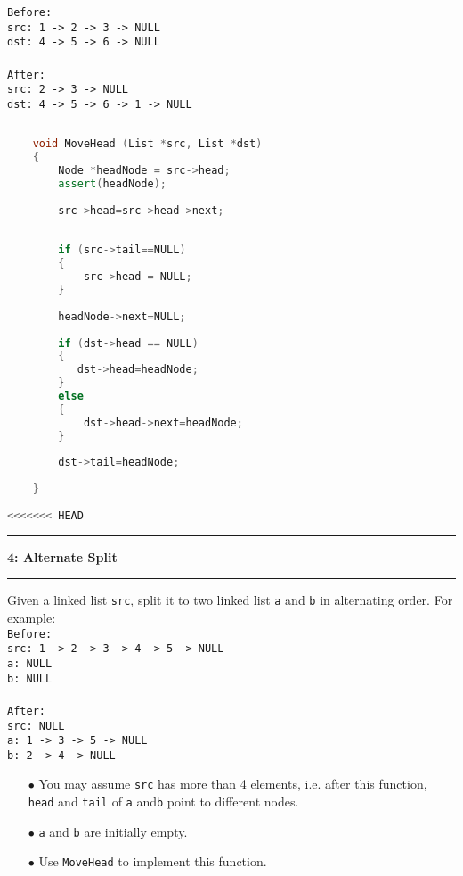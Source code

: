 \documentclass[10.5pt]{article}
\newcommand\question[2]{\vspace{.25in}\hrule\textbf{#1: #2}\vspace{.5em}\hrule\vspace{.10in}}
\begin{document}
    \texttt{Before:}\\
    \texttt{src: 1 -> 2 -> 3 -> NULL}\\
    \texttt{dst: 4 -> 5 -> 6 -> NULL}\\
    \\
    \texttt{After:}\\
    \texttt{src: 2 -> 3 -> NULL}\\
    \texttt{dst: 4 -> 5 -> 6 -> 1 -> NULL}\\
    
    
    \hrulefill
    \begin{lstlisting}[language=C++]
    
    void MoveHead (List *src, List *dst)
    {
        Node *headNode = src->head;
        assert(headNode);
        
        src->head=src->head->next;
        
            
        if (src->tail==NULL)
        {
            src->head = NULL;
        }
        
        headNode->next=NULL;
        
        if (dst->head == NULL)
        {
           dst->head=headNode;
        }
        else
        {
            dst->head->next=headNode;
        }
        
        dst->tail=headNode;
        
    }
    
<<<<<<< HEAD
    \end{lstlisting}
    \pagebreak
    
    \question{4}{Alternate Split}
    Given a linked list \texttt{src}, split it to two linked list  \texttt{a} and \texttt{b} in alternating order. For example:\\
    
    \texttt{Before:}\\
    \texttt{src: 1 -> 2 -> 3 -> 4 -> 5 -> NULL}\\
    \texttt{a: NULL}\\
    \texttt{b: NULL}\\
    \\
    \texttt{After:}\\
    \texttt{src: NULL}\\
    \texttt{a: 1 -> 3 -> 5 -> NULL}\\
    \texttt{b: 2 -> 4 -> NULL}\\
    
    \begin{enumerate}
        \item[$\bullet$] You may assume \texttt{src} has more than 4 elements, i.e. after this function, \texttt{head} and \texttt{tail} of \texttt{a} and\texttt{b} point to different nodes.
        \item[$\bullet$] \texttt{a} and \texttt{b} are initially empty.
        \item[$\bullet$] Use \texttt{MoveHead} to implement this function.
    \end{enumerate}
    
\end{document}
